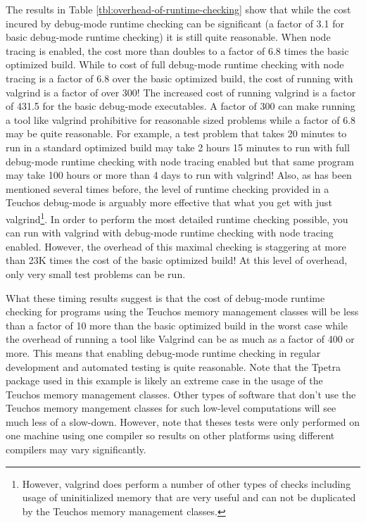 \documentclass[pdf,ps2pdf,11pt]{SANDreport}
\begin{document}
The results in Table {}\ref{tbl:overhead-of-runtime-checking} show
that while the cost incured by debug-mode runtime checking can be
significant (a factor of 3.1 for basic debug-mode runtime checking) it
is still quite reasonable.  When node tracing is enabled, the cost
more than doubles to a factor of 6.8 times the basic optimized build.
While to cost of full debug-mode runtime checking with node tracing is
a factor of 6.8 over the basic optimized build, the cost of running
with valgrind is a factor of over 300!  The increased cost of running
valgrind is a factor of 431.5 for the basic debug-mode executables.  A
factor of 300 can make running a tool like valgrind prohibitive for
reasonable sized problems while a factor of 6.8 may be quite
reasonable.  For example, a test problem that takes 20 minutes to run
in a standard optimized build may take 2 hours 15 minutes to run with
full debug-mode runtime checking with node tracing enabled but that
same program may take 100 hours or more than 4 days to run with
valgrind!  Also, as has been mentioned several times before, the level
of runtime checking provided in a Teuchos debug-mode is arguably more
effective that what you get with just valgrind\footnote{However,
valgrind does perform a number of other types of checks including
usage of uninitialized memory that are very useful and can not be
duplicated by the Teuchos memory management classes.}.  In order to
perform the most detailed runtime checking possible, you can run with
valgrind with debug-mode runtime checking with node tracing enabled.
However, the overhead of this maximal checking is staggering at more
than 23K times the cost of the basic optimized build!  At this level
of overhead, only very small test problems can be run.

What these timing results suggest is that the cost of debug-mode
runtime checking for programs using the Teuchos memory management
classes will be less than a factor of 10 more than the basic optimized
build in the worst case while the overhead of running a tool like
Valgrind can be as much as a factor of 400 or more.  This means that
enabling debug-mode runtime checking in regular development and
automated testing is quite reasonable.  Note that the Tpetra package
used in this example is likely an extreme case in the usage of the
Teuchos memory management classes.  Other types of software that don't
use the Teuchos memory mangement classes for such low-level
computations will see much less of a slow-down.  However, note that
theses tests were only performed on one machine using one compiler so
results on other platforms using different compilers may vary
significantly.
\end{document}
